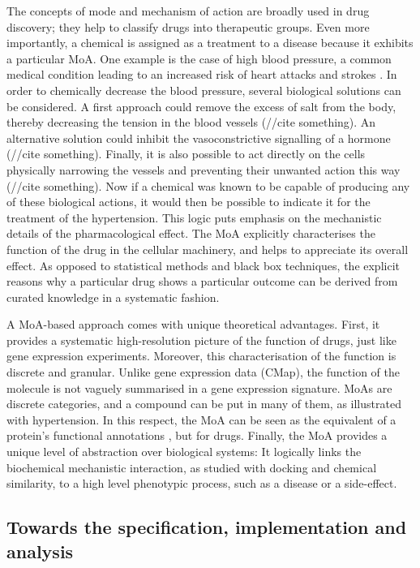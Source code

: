 The concepts of mode and mechanism of action are broadly used in drug discovery; they help to classify drugs into therapeutic groups. Even more importantly, a chemical is assigned as a treatment to a disease because it exhibits a particular MoA. One example is the case of high blood pressure, a common medical condition leading to an increased risk of heart attacks and strokes \citep{hypertensionnhs}. In order to chemically decrease the blood pressure, several biological solutions can be considered. A first approach could remove the excess of salt from the body, thereby decreasing the tension in the blood vessels (//cite something). An alternative solution could inhibit the vasoconstrictive signalling of a hormone (//cite something). Finally, it is also possible to act directly on the cells physically narrowing the vessels and preventing their unwanted action this way (//cite something). Now if a chemical was known to be capable of producing any of these biological actions, it would then be possible to indicate it for the treatment of the hypertension. This logic puts emphasis on the mechanistic details of the pharmacological effect. The MoA explicitly characterises the function of the drug in the cellular machinery, and helps to appreciate its overall effect. As opposed to statistical methods and black box techniques, the explicit reasons why a particular drug shows a particular outcome can be derived from curated knowledge in a systematic fashion.

A MoA-based approach comes with unique theoretical advantages. First, it provides a systematic high-resolution picture of the function of drugs, just like gene expression experiments. Moreover, this characterisation of the function is discrete and granular. Unlike gene expression data (CMap), the function of the molecule is not vaguely summarised in a gene expression signature. MoAs are discrete categories, and a compound can be put in many of them, as illustrated with hypertension. In this respect, the MoA can be seen as the equivalent of a protein’s functional annotations \citep{ashburner2000gene}, but for drugs. Finally, the MoA provides a unique level of abstraction over biological systems: It logically links the biochemical mechanistic interaction, as studied with docking and chemical similarity, to a high level phenotypic process, such as a disease or a side-effect.

\subsection{Towards the specification, implementation and analysis}

